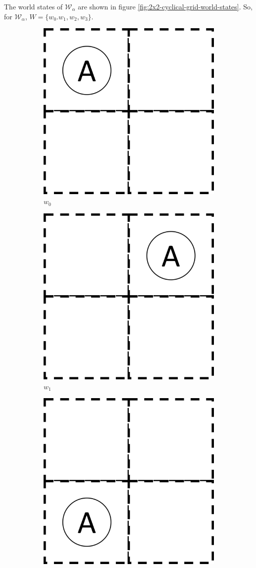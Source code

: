 The world states of $\mathscr{W}_{\alpha}$ are shown in figure \ref{fig:2x2-cyclical-grid-world-states}.
So, for $\mathscr{W}_{\alpha}$, $W = \{ w_{0}. w_{1}, w_{2}, w_{3} \}$.
\begin{figure}[H]
	\centering
	\begin{subfigure}[b]{0.45\linewidth}
		\centering
		\includegraphics[width=0.5\linewidth]{2MathematicalFramework/Images/2x2_no_walls_world_states/w0.png}
		\caption{$w_{0}$}
		\vspace{0.25cm}
	\end{subfigure}
	\begin{subfigure}[b]{0.45\linewidth}
		\centering
		\includegraphics[width=0.5\linewidth]{2MathematicalFramework/Images/2x2_no_walls_world_states/w1.png}
		\caption{$w_{1}$}
		\vspace{0.25cm}
	\end{subfigure}
	\begin{subfigure}[b]{0.45\linewidth}
		\centering
		\includegraphics[width=0.5\linewidth]{2MathematicalFramework/Images/2x2_no_walls_world_states/w2.png}

\end{subfigure}
\end{figure}
